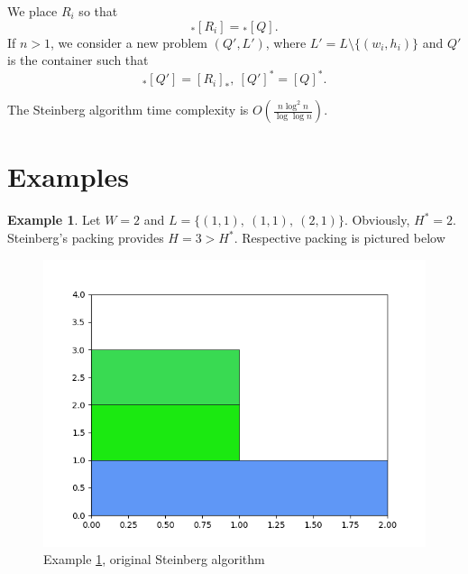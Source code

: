 \documentclass{article}
\theoremstyle{definition}
\newtheorem{example}{Example}
\theoremstyle{theorem}
\numberwithin{proposition}{section}
\begin{document}
\begin{enumerate}
            We place $R_i$ so that
            \begin{equation*}
                 {}_{*}[R_i] = {}_{*}[Q].
            \end{equation*}
            If $n>1$, we consider a new problem $(Q',L')$, where $L' = L \setminus \{(w_i,h_i)\}$ and $Q'$ is the container such that
            \begin{equation*}
                {}_{*}[Q']=[R_i]_{*},~[Q']^{*}=[Q]^{*}.
            \end{equation*}
    \end{enumerate}
    The Steinberg algorithm time complexity is $O(\frac{n\log^2 n}{\log\log n})$. 
\section*{Examples}
    \begin{example}\label{ex1}
        Let $W = 2$ and $L = \{(1,1),~(1,1),~(2,1)\}$. Obviously, $H^{*} = 2$. Steinberg’s packing provides $H = 3 > H^{*}$. Respective packing is pictured below
        \begin{figure}[H]
            \centering
            \includegraphics[scale=0.5]{../examples/original-1.png}
            \caption{Example \ref{ex1}, original Steinberg algorithm}
        \end{figure} 
    \end{example}
\end{document}
